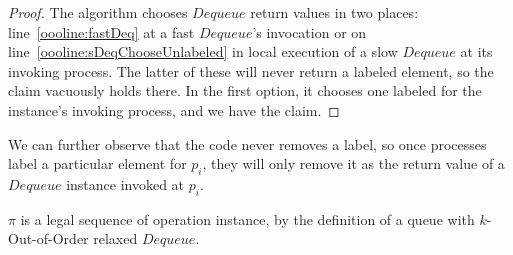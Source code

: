 \documentclass[a4paper,anonymous,USenglish]{lipics-v2021}
\theoremstyle{definition}
\begin{document}
\begin{proof}
  The algorithm chooses $Dequeue$ return values in two places: line~\ref{oooline:fastDeq} at a fast $Dequeue$'s invocation or on line~\ref{oooline:sDeqChooseUnlabeled} in local execution of a slow $Dequeue$ at its invoking process.  The latter of these will never return a labeled element, so the claim vacuously holds there.  In the first option, it chooses one labeled for the instance's invoking process, and we have the claim.
\end{proof}

We can further observe that the code never removes a label, so once processes label a particular element for $p_i$, they will only remove it as the return value of a $Dequeue$ instance invoked at $p_i$.

\begin{lemma}
  $\pi$ is a legal sequence of operation instance, by the definition of a queue with $k$-Out-of-Order relaxed $Dequeue$.
\end{lemma}
\end{document}
